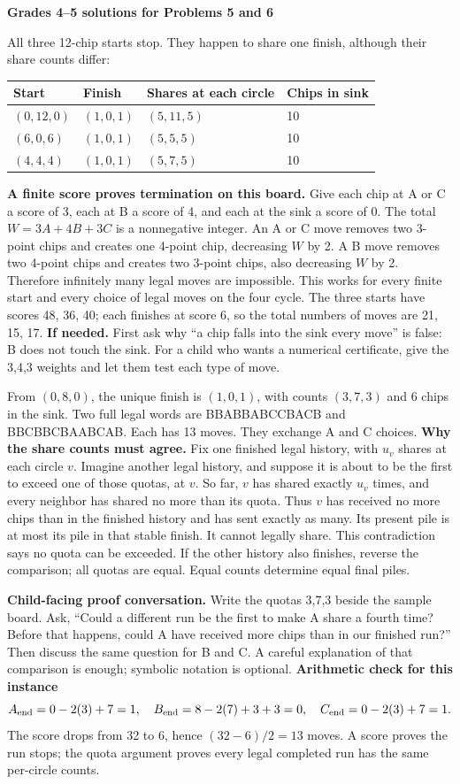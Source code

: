 \documentclass[11pt,letterpaper]{article}
\newcommand{\pagehead}[1]{{\Large\bfseries #1}\par\vspace{3pt}}
\newcommand{\prob}[2]{\par\vspace{5pt}{\large\bfseries #1}\par #2}
\newcommand{\hint}[1]{\textbf{If needed.} #1\par}
\begin{document}
\newpage
\pagehead{Grades 4--5 solutions for Problems 5 and 6}
\prob{Problem 5}{All three 12-chip starts stop. They happen to share one finish, although their share counts differ:}
\begin{center}\begin{tabular}{llll}\toprule Start & Finish & Shares at each circle & Chips in sink\\\midrule
$(0,12,0)$ & $(1,0,1)$ & $(5,11,5)$ & 10\\
$(6,0,6)$ & $(1,0,1)$ & $(5,5,5)$ & 10\\
$(4,4,4)$ & $(1,0,1)$ & $(5,7,5)$ & 10\\
\bottomrule\end{tabular}\end{center}

\textbf{A finite score proves termination on this board.} Give each chip at A or C a score of 3, each at B a score of 4, and each at the sink a score of 0. The total $W=3A+4B+3C$ is a nonnegative integer. An A or C move removes two 3-point chips and creates one 4-point chip, decreasing $W$ by 2. A B move removes two 4-point chips and creates two 3-point chips, also decreasing $W$ by 2. Therefore infinitely many legal moves are impossible. This works for every finite start and every choice of legal moves on the four cycle. The three starts have scores 48, 36, 40; each finishes at score 6, so the total numbers of moves are 21, 15, 17.
\hint{First ask why ``a chip falls into the sink every move'' is false: B does not touch the sink. For a child who wants a numerical certificate, give the 3,4,3 weights and let them test each type of move.}
\prob{Problem 6}{From $(0,8,0)$, the unique finish is $(1,0,1)$, with counts $(3,7,3)$ and 6 chips in the sink. Two full legal words are BBABBABCCBACB and BBCBBCBAABCAB. Each has 13 moves. They exchange A and C choices.}
\textbf{Why the share counts must agree.} Fix one finished legal history, with $u_v$ shares at each circle $v$. Imagine another legal history, and suppose it is about to be the first to exceed one of those quotas, at $v$. So far, $v$ has shared exactly $u_v$ times, and every neighbor has shared no more than its quota. Thus $v$ has received no more chips than in the finished history and has sent exactly as many. Its present pile is at most its pile in that stable finish. It cannot legally share. This contradiction says no quota can be exceeded. If the other history also finishes, reverse the comparison; all quotas are equal. Equal counts determine equal final piles.

\textbf{Child-facing proof conversation.} Write the quotas 3,7,3 beside the sample board. Ask, ``Could a different run be the first to make A share a fourth time? Before that happens, could A have received more chips than in our finished run?'' Then discuss the same question for B and C. A careful explanation of that comparison is enough; symbolic notation is optional.
\textbf{Arithmetic check for this instance}
\[
A_{\rm end}=0-2(3)+7=1,\quad
B_{\rm end}=8-2(7)+3+3=0,\quad
C_{\rm end}=0-2(3)+7=1.
\]
The score drops from 32 to 6, hence $(32-6)/2=13$ moves. A score proves the run stops; the quota argument proves every legal completed run has the same per-circle counts.
\end{document}
